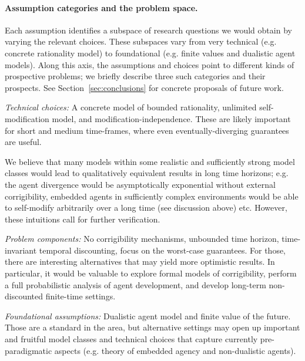 \paragraph{Assumption categories and the problem space.}

Each assumption identifies a subspace of research questions we would obtain by varying the relevant choices. These subspaces vary from very technical (e.g. concrete rationality model) to foundational (e.g. finite values and dualistic agent models). Along this axis, the assumptions and choices point to different kinds of prospective problems; we briefly describe three such categories and their prospects. See Section~\ref{sec:conclusions} for concrete proposals of future work.

\medskip
\noindent
\emph{Technical choices:} A concrete model of bounded rationality, unlimited self-modification model, and modification-independence. These are likely important for short and medium time-frames, where even eventually-diverging guarantees are useful.

We believe that many models within some realistic and sufficiently strong model classes would lead to qualitatively equivalent results in long time horizons; e.g. the agent divergence would be asymptotically exponential without external corrigibility, embedded agents in sufficiently complex environments would be able to self-modify arbitrarily over a long time (see discussion above) etc. However, these intuitions call for further verification.

\medskip
\noindent
\emph{Problem components:} No corrigibility mechanisms, unbounded time horizon, time-invariant temporal discounting, focus on the worst-case guarantees. For those, there are interesting alternatives that may yield more optimistic results. In particular, it would be valuable to explore formal models of corrigibility, perform a full probabilistic analysis of agent development, and develop long-term non-discounted finite-time settings.

\medskip
\noindent
\emph{Foundational assumptions:} Dualistic agent model and finite value of the future. Those are a standard in the area, but alternative settings may open up important and fruitful model classes and technical choices that capture currently pre-paradigmatic aspects (e.g. theory of embedded agency and non-dualistic agents).

